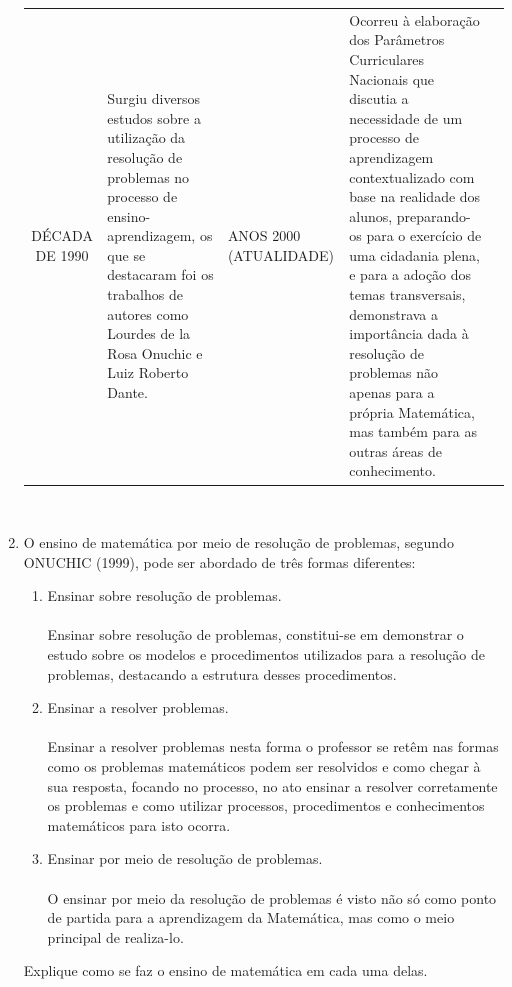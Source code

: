 \documentclass[a4paper, 12pt]{article}
\begin{document}
\begin{enumerate}
\begin{center}
\begin{longtable}{| c | p{10cm} |}
    DÉCADA DE 1990 & Surgiu diversos estudos sobre a utilização da resolução de problemas no processo de ensino-aprendizagem, os que se destacaram foi os trabalhos de autores como Lourdes de la Rosa Onuchic e Luiz Roberto Dante.
 & \hline 
    ANOS 2000 (ATUALIDADE) & Ocorreu à elaboração dos Parâmetros Curriculares Nacionais que discutia a necessidade de um processo de aprendizagem contextualizado com base na realidade dos alunos, preparando-os para o exercício de uma cidadania plena, e para a adoção dos temas transversais, demonstrava a importância dada à resolução de problemas não apenas para a própria Matemática, mas também para as outras áreas de conhecimento.
 & \hline 
  \end{longtable} \\
  \end{center}
\item O ensino de matemática por meio de resolução de problemas, segundo ONUCHIC (1999), pode ser abordado de três formas diferentes: \\
  \begin{enumerate}
  \item Ensinar sobre resolução de problemas. \\ \\
      Ensinar sobre resolução de problemas, constitui-se em demonstrar o estudo sobre os modelos e procedimentos utilizados para a resolução de problemas, destacando a estrutura desses procedimentos.
    \item Ensinar a resolver problemas. \\ \\
      Ensinar a resolver problemas nesta forma o professor se retêm nas formas como os problemas matemáticos podem ser resolvidos e como chegar à sua resposta, focando no processo, no ato ensinar a resolver corretamente os problemas e como utilizar processos, procedimentos e conhecimentos matemáticos para isto ocorra.
      
    \item Ensinar por meio de resolução de problemas. \\ \\
       O ensinar por meio da resolução de problemas é visto não só como ponto de partida para a aprendizagem da Matemática, mas como o meio principal de realiza-lo.
  \end{enumerate}
  Explique como se faz o ensino de matemática em cada uma delas. \\


\end{enumerate}
\end{document}
